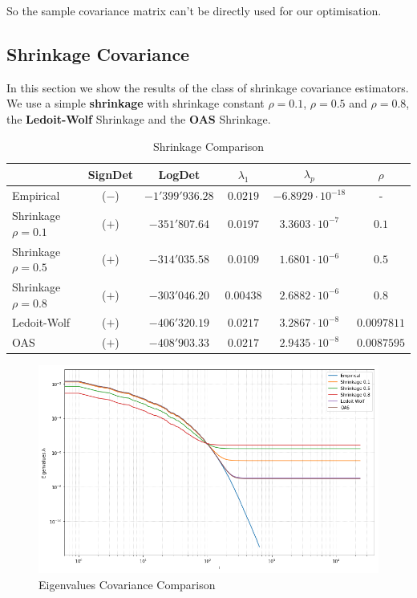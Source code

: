 So the sample covariance matrix can't be directly used for our optimisation.  

\subsection{Shrinkage Covariance}

In this section we show the results of the class of shrinkage covariance estimators. We use a simple \textbf{shrinkage} with shrinkage constant $\rho = 0.1$,  $\rho = 0.5$ and $\rho = 0.8$,  the \textbf{Ledoit-Wolf} Shrinkage and the \textbf{OAS} Shrinkage. 

\begin{table}[h]
\centering
    \begin{tabular}{l|ccccc}
     \toprule
        & SignDet & LogDet & $\lambda_1$ & $\lambda_p$ & $\rho$ \\ \midrule
        Empirical & ($-$) & $-1'399'936.28$ &  $0.0219$ & $-6.8929 \cdot 10^{-18}$ & -\\
        Shrinkage $\rho=0.1$ & ($+$) & $-351'807.64$ &  $0.0197$ &$3.3603\cdot 10^{-7}$ & $0.1$\\
        Shrinkage $\rho=0.5$ & ($+$) & $-314'035.58$ &  $0.0109$  &$1.6801 \cdot 10^{-6}$ & $0.5$\\
        Shrinkage $\rho=0.8$ & ($+$) & $-303'046.20$ &  $0.00438$  &$2.6882 \cdot 10^{-6}$ & $0.8$\\
        Ledoit-Wolf & ($+$) & $-406'320.19$&  $0.0217$ & $3.2867\cdot 10^{-8}$ & $0.0097811$\\
        OAS & ($+$) & $-408'903.33$ & $0.0217$ & $2.9435\cdot 10^{-8}$ & $0.0087595$ \\  \bottomrule
    \end{tabular}
    \caption{Shrinkage Comparison}
\end{table}

\begin{figure}[h!]
\centering
    \includegraphics[width=0.8\linewidth]{figures/Covariance/Tracer_23643/cov_all_eigenval_loglog_zoom}
    \caption{Eigenvalues Covariance Comparison}
    \label{fig:cov:comparison:eigs}
\end{figure}

